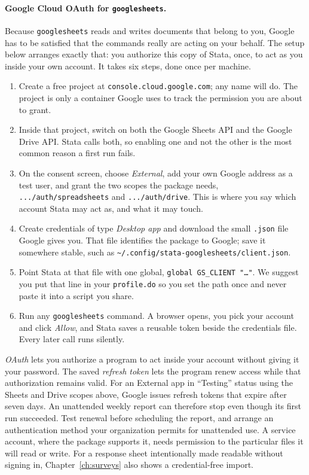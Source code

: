 \documentclass[
    a4paper,
    fontsize=10pt,
    twoside=true,
    numbers=noenddot,
]{kaobook}
\begin{document}
\paragraph{Google Cloud OAuth for \texttt{googlesheets}.} Because \texttt{googlesheets} reads and writes documents that belong to you, Google has to be satisfied that the commands really are acting on your behalf. The setup below arranges exactly that: you authorize this copy of Stata, once, to act as you inside your own account. It takes six steps, done once per machine.
\begin{enumerate}
    \item Create a free project at \texttt{console.cloud.google.com}; any name will do. The project is only a container Google uses to track the permission you are about to grant.
    \item Inside that project, switch on both the Google Sheets API and the Google Drive API. Stata calls both, so enabling one and not the other is the most common reason a first run fails.
    \item On the consent screen, choose \emph{External}, add your own Google address as a test user, and grant the two scopes the package needs, \texttt{.../auth/spreadsheets} and \texttt{.../auth/drive}. This is where you say which account Stata may act as, and what it may touch.
    \item Create credentials of type \emph{Desktop app} and download the small \texttt{.json} file Google gives you. That file identifies the package to Google; save it somewhere stable, such as \texttt{\~{}/.config/stata-googlesheets/client.json}.
    \item Point Stata at that file with one global, \texttt{global GS\_CLIENT "\ldots"}. We suggest you put that line in your \texttt{profile.do} so you set the path once and never paste it into a script you share.
    \item Run any \texttt{googlesheets} command. A browser opens, you pick your account and click \emph{Allow}, and Stata saves a reusable token beside the credentials file. Every later call runs silently.
\end{enumerate}
\emph{OAuth} lets you authorize a program to act inside your account without giving it your password. The saved \emph{refresh token} lets the program renew access while that authorization remains valid. For an External app in \enquote{Testing} status using the Sheets and Drive scopes above, Google issues refresh tokens that expire after seven days. An unattended weekly report can therefore stop even though its first run succeeded. Test renewal before scheduling the report, and arrange an authentication method your organization permits for unattended use. A service account, where the package supports it, needs permission to the particular files it will read or write. For a response sheet intentionally made readable without signing in, Chapter~\ref{ch:surveys} also shows a credential-free import.
\end{document}
